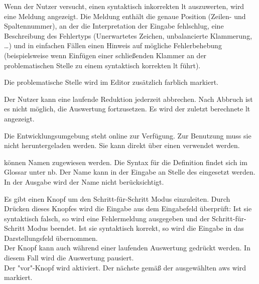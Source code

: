 \documentclass[parskip=full,11pt,twoside]{scrartcl}
\begin{document}
Wenn der Nutzer versucht, einen syntaktisch inkorrekten \gls{lt} auszuwerten,
wird eine Meldung angezeigt. Die Meldung enthält die genaue Position (Zeilen-
und Spaltennummer), an der die Interpretation der Eingabe fehlschlug, eine Beschreibung
des Fehlertyps (Unerwartetes Zeichen, unbalancierte Klammerung, \ldots) und in einfachen
Fällen einen Hinweis auf mögliche Fehlerbehebung (beispielsweise wenn Einfügen einer
schließenden Klammer an der problematischen Stelle zu einem syntaktisch korrekten
\gls{lt} führt).

Die problematische Stelle wird im Editor zusätzlich farblich markiert.

Der Nutzer kann eine laufende Reduktion jederzeit abbrechen.
Nach Abbruch ist es nicht möglich, die Auswertung fortzusetzen.
Es wird der zuletzt berechnete \gls{lt} angezeigt.

Die Entwicklungsumgebung steht online zur Verfügung.
Zur Benutzung muss sie nicht heruntergeladen werden.
Sie kann direkt über einen  verwendet werden.

 können Namen zugewiesen werden.
Die Syntax für die Definition findet sich im Glossar unter \gls{nb}.
Der Name kann in der Eingabe an Stelle des  eingesetzt werden.
In der Ausgabe wird der Name nicht berücksichtigt. 

Es gibt einen Knopf um den Schritt-für-Schritt Modus einzuleiten.
Durch Drücken dieses Knopfes wird die Eingabe aus dem Eingabefeld überprüft:
Ist sie syntaktisch falsch, so wird eine Fehlermeldung ausgegeben und der Schritt-für-Schritt Modus beendet.
Ist sie syntaktisch korrekt, so wird die Eingabe in das Darstellungsfeld übernommen.
\\
Der Knopf kann auch während einer laufenden Auswertung gedrückt werden.
In diesem Fall wird die Auswertung pausiert.
\\
Der "vor"-Knopf wird aktiviert.
Der nächste  gemäß der ausgewählten \gls{aws} wird markiert.
\end{document}
